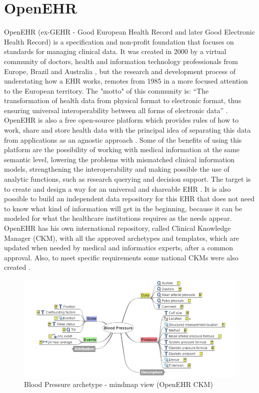 \documentclass[mim_thesis.tex]{subfiles}
\begin{document}
\section{OpenEHR}
OpenEHR (ex-GEHR - Good European Health Record and later Good Electronic Health Record) is a specification and non-profit foundation that focuses on standards for managing clinical data. It was created in 2000 by a virtual community of doctors, health and information technology professionals from Europe, Brazil and Australia \citep{openEHRhist2002}, but the research and development process of understating how a EHR works, remotes from 1985 in a more focused attention to the European territory. The "motto" of this community is: “The transformation of health data from physical format to electronic format, thus ensuring universal interoperability between all forms of electronic data” \citep{openEHR2018}. OpenEHR is also a free open-source platform which provides rules of how to work, share and store health data with the principal idea of separating this data from applications as an agnostic approach \citep{kalra2005openehr}. Some of the benefits of using this platform are the possibility of working with medical information at the same semantic level, lowering the problems with mismatched clinical information models, strengthening the interoperability and making possible the use of analytic functions, such as research querying and decision support. The target is to create and design a way for an universal and shareable EHR \citep{Madsen2010}.  It is also possible to build an independent data repository for this EHR that does not need to know what kind of information will get in the beginning, because it can be modeled for what the healthcare institutions requires as 
the needs appear. OpenEHR has his own international repository, called Clinical Knowledge Manager (CKM), with all the approved archetypes and templates, which are updated when needed by medical and informatics experts, after a common approval. Also, to meet specific requirements some national CKMs were also created \citep{openEHRCKM}.

\begin{figure}[H]
	\centering
    \includegraphics[width=1\textwidth]{img/bp_openehr.PNG}
	\caption{ Blood Pressure archetype - mindmap view (OpenEHR CKM)}
	\label{fig:bp_openehr}
\end{figure}
\end{document}
